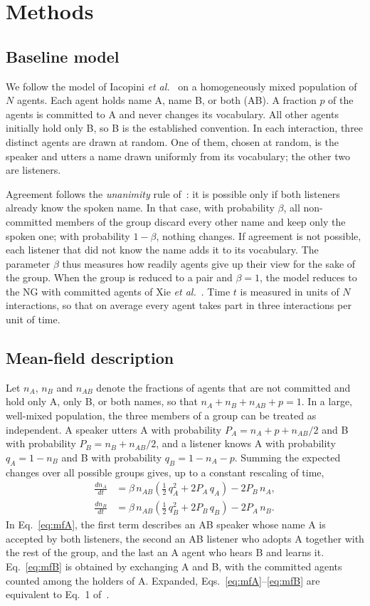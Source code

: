 \documentclass[9pt,twoside]{pnas-new}
\begin{document}
\section{Methods}

\subsection{Baseline model}
We follow the model of Iacopini \emph{et al.}~\cite{iacopini2022group} on a
homogeneously mixed population of $N$ agents. Each agent holds name A, name B,
or both (AB). A fraction $p$ of the agents is committed to A and never changes
its vocabulary. All other agents initially hold only B, so B is the established
convention. In each interaction, three distinct agents are drawn at random. One
of them, chosen at random, is the speaker and utters a name drawn uniformly from
its vocabulary; the other two are listeners.

Agreement follows the \emph{unanimity} rule of~\cite{iacopini2022group}: it is
possible only if both listeners already know the spoken name. In that case, with
probability $\beta$, all non-committed members of the group discard every other
name and keep only the spoken one; with probability $1-\beta$, nothing changes.
If agreement is not possible, each listener that did not know the name adds it
to its vocabulary. The parameter $\beta$ thus measures how readily agents give
up their view for the sake of the group. When the group is reduced to a pair and
$\beta=1$, the model reduces to the NG with committed agents of Xie
\emph{et al.}~\cite{xie2011social}. Time $t$ is measured in units of $N$
interactions, so that on average every agent takes part in three interactions
per unit of time.

\subsection{Mean-field description}
Let $n_A$, $n_B$ and $n_{AB}$ denote the fractions of agents that are not
committed and hold only A, only B, or both names, so that
$n_A+n_B+n_{AB}+p=1$. In a large, well-mixed population, the three members of a
group can be treated as independent. A speaker utters A with probability
$P_A=n_A+p+n_{AB}/2$ and B with probability $P_B=n_B+n_{AB}/2$, and a listener
knows A with probability $q_A=1-n_B$ and B with probability $q_B=1-n_A-p$.
Summing the expected changes over all possible groups gives, up to a constant
rescaling of time,
\begin{align}
\frac{dn_A}{dt} &= \beta\, n_{AB}\left(\tfrac12\, q_A^{2} + 2P_A\, q_A\right) - 2P_B\, n_A, \label{eq:mfA}\\
\frac{dn_B}{dt} &= \beta\, n_{AB}\left(\tfrac12\, q_B^{2} + 2P_B\, q_B\right) - 2P_A\, n_B. \label{eq:mfB}
\end{align}
In Eq.~\ref{eq:mfA}, the first term describes an AB speaker whose name A is
accepted by both listeners, the second an AB listener who adopts A together with
the rest of the group, and the last an A agent who hears B and learns it.
Eq.~\ref{eq:mfB} is obtained by exchanging A and B, with the committed agents
counted among the holders of A. Expanded, Eqs.~\ref{eq:mfA}--\ref{eq:mfB} are
equivalent to Eq.~1 of~\cite{iacopini2022group}.
\end{document}
